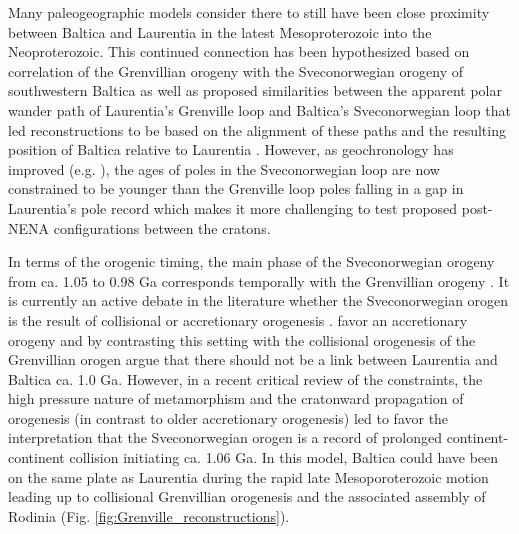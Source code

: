 \documentclass[twocolumn, switch]{article} %
\begin{document}
Many paleogeographic models consider there to still have been close proximity between Baltica and Laurentia in the latest Mesoproterozoic into the Neoproterozoic. This continued connection has been hypothesized based on correlation of the Grenvillian orogeny with the Sveconorwegian orogeny of southwestern Baltica \citep{Gower1990b} as well as proposed similarities between the apparent polar wander path of Laurentia's Grenville loop and Baltica's Sveconorwegian loop that led reconstructions to be based on the alignment of these paths and the resulting position of Baltica relative to Laurentia \citep{Piper1980a,Pisarevsky2003a}. However, as geochronology has improved (e.g. \citealp{Gong2018b}), the ages of poles in the Sveconorwegian loop are now constrained to be younger than the Grenville loop poles falling in a gap in Laurentia's pole record \citep{Evans2015a,Fairchild2017a} which makes it more challenging to test proposed post-NENA configurations between the cratons.

In terms of the orogenic timing, the main phase of the Sveconorwegian orogeny from ca. 1.05 to 0.98 Ga corresponds temporally with the Grenvillian orogeny \citep{Stephens2020a}. It is currently an active debate in the literature whether the Sveconorwegian orogen is the result of collisional or accretionary orogenesis \citep{Stephens2020a}. \cite{Slagstad2019a} favor an accretionary orogeny and by contrasting this setting with the collisional orogenesis of the Grenvillian orogen argue that there should not be a link between Laurentia and Baltica ca. 1.0 Ga. However, in a recent critical review of the constraints, the high pressure nature of metamorphism and the cratonward propagation of orogenesis (in contrast to older accretionary orogenesis) led \cite{Stephens2020a} to favor the interpretation that the Sveconorwegian orogen is a record of prolonged continent-continent collision initiating ca. 1.06 Ga. In this model, Baltica could have been on the same plate as Laurentia during the rapid late Mesoporoterozoic motion leading up to collisional Grenvillian orogenesis and the associated assembly of Rodinia (Fig. \ref{fig:Grenville_reconstructions}).
\end{document}
